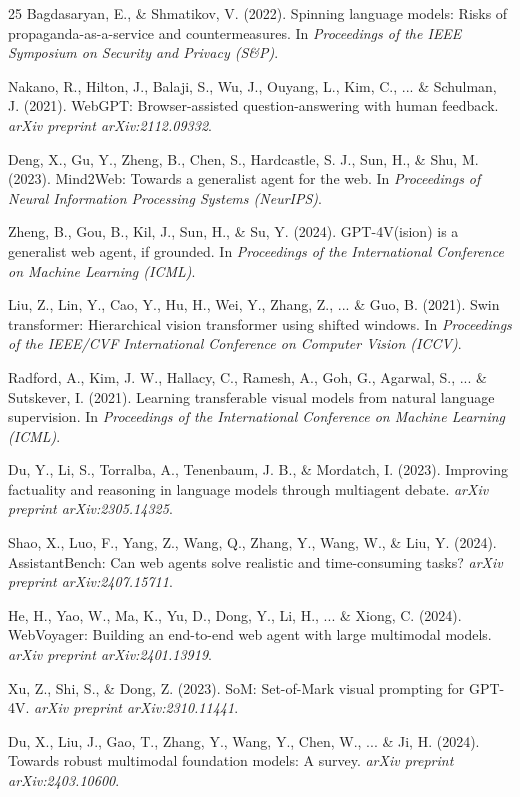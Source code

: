 \documentclass[runningheads]{llncs}
\begin{document}
\begin{thebibliography}{25}
Bagdasaryan, E., \& Shmatikov, V. (2022). Spinning language models: Risks of propaganda-as-a-service and countermeasures. In \textit{Proceedings of the IEEE Symposium on Security and Privacy (S&P)}.

Nakano, R., Hilton, J., Balaji, S., Wu, J., Ouyang, L., Kim, C., ... \& Schulman, J. (2021). WebGPT: Browser-assisted question-answering with human feedback. \textit{arXiv preprint arXiv:2112.09332}.

Deng, X., Gu, Y., Zheng, B., Chen, S., Hardcastle, S. J., Sun, H., \& Shu, M. (2023). Mind2Web: Towards a generalist agent for the web. In \textit{Proceedings of Neural Information Processing Systems (NeurIPS)}.

Zheng, B., Gou, B., Kil, J., Sun, H., \& Su, Y. (2024). GPT-4V(ision) is a generalist web agent, if grounded. In \textit{Proceedings of the International Conference on Machine Learning (ICML)}.

Liu, Z., Lin, Y., Cao, Y., Hu, H., Wei, Y., Zhang, Z., ... \& Guo, B. (2021). Swin transformer: Hierarchical vision transformer using shifted windows. In \textit{Proceedings of the IEEE/CVF International Conference on Computer Vision (ICCV)}.

Radford, A., Kim, J. W., Hallacy, C., Ramesh, A., Goh, G., Agarwal, S., ... \& Sutskever, I. (2021). Learning transferable visual models from natural language supervision. In \textit{Proceedings of the International Conference on Machine Learning (ICML)}.

Du, Y., Li, S., Torralba, A., Tenenbaum, J. B., \& Mordatch, I. (2023). Improving factuality and reasoning in language models through multiagent debate. \textit{arXiv preprint arXiv:2305.14325}.

Shao, X., Luo, F., Yang, Z., Wang, Q., Zhang, Y., Wang, W., \& Liu, Y. (2024). AssistantBench: Can web agents solve realistic and time-consuming tasks? \textit{arXiv preprint arXiv:2407.15711}.

He, H., Yao, W., Ma, K., Yu, D., Dong, Y., Li, H., ... \& Xiong, C. (2024). WebVoyager: Building an end-to-end web agent with large multimodal models. \textit{arXiv preprint arXiv:2401.13919}.

Xu, Z., Shi, S., \& Dong, Z. (2023). SoM: Set-of-Mark visual prompting for GPT-4V. \textit{arXiv preprint arXiv:2310.11441}.

Du, X., Liu, J., Gao, T., Zhang, Y., Wang, Y., Chen, W., ... \& Ji, H. (2024). Towards robust multimodal foundation models: A survey. \textit{arXiv preprint arXiv:2403.10600}.


\end{thebibliography}
\end{document}
